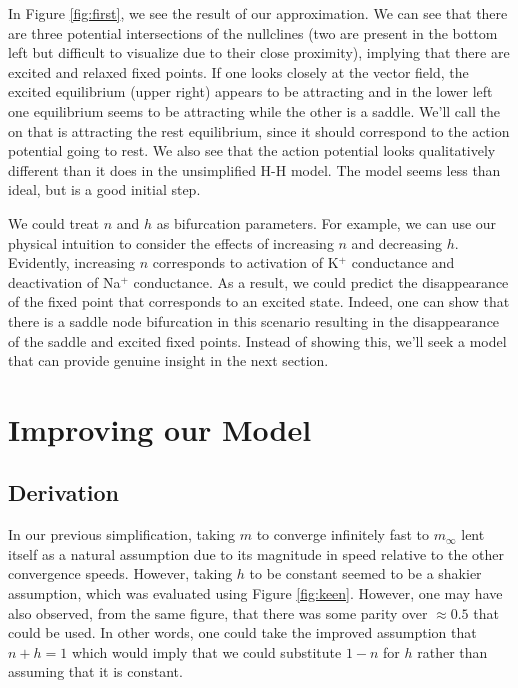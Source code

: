 \documentclass{article}
\begin{document}
In Figure \ref{fig:first}, we see the result of our approximation. We can see that there are three potential intersections of the nullclines (two are present in the bottom left but difficult to visualize due to their close proximity), implying that there are excited and relaxed fixed points. If one looks closely at the vector field, the excited equilibrium (upper right) appears to be attracting and in the lower left one equilibrium seems to be attracting while the other is a saddle. We'll call the on that is attracting the rest equilibrium, since it should correspond to the action potential going to rest. We also see that the action potential looks qualitatively different than it does in the unsimplified H-H model. The model seems less than ideal, but is a good initial step. 

We could treat $n$ and $h$ as bifurcation parameters. For example, we can use our physical intuition to consider the effects of increasing $n$ and decreasing $h$. Evidently, increasing $n$ corresponds to activation of K$^+$ conductance and deactivation of Na$^+$ conductance. As a result, we could predict the disappearance of the fixed point that corresponds to an excited state. Indeed, one can show that there is a saddle node bifurcation in this scenario resulting in the disappearance of the saddle and excited fixed points.\cite{keener} Instead of showing this, we'll seek a model that can provide genuine insight in the next section.




\section{Improving our Model}

\subsection{Derivation}

In our previous simplification, taking $m$ to converge infinitely fast to $m_\infty$ lent itself as a natural assumption due to its magnitude in speed relative to the other convergence speeds. However, taking $h$ to be constant seemed to be a shakier assumption, which was evaluated using Figure \ref{fig:keen}. However, one may have also observed, from the same figure, that there was some parity over $\approx 0.5$ that could be used. In other words, one could take the improved assumption that $n + h = 1$ which would imply that we could substitute $1 - n$ for $h$ rather than assuming that it is constant.
\end{document}
